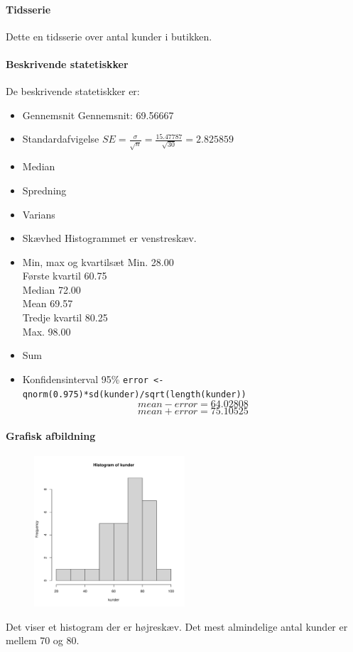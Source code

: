 \documentclass{article}
\begin{document}
\paragraph{Tidsserie} Dette en tidsserie over antal kunder i butikken.


\paragraph{Beskrivende statetiskker}
De beskrivende statetiskker er:
\begin{itemize}
  \item Gennemsnit
    \subitem Gennemsnit: 69.56667
  \item Standardafvigelse
    \subitem $SE = \frac{\sigma}{\sqrt{n}}= \frac{15.47787}{\sqrt{30}}  = 2.825859$
  \item Median
  \item Spredning
  \item Varians
  \item Skævhed
    \subitem Histogrammet er venstreskæv.
  \item Min, max og kvartilsæt
    \subitem Min. 28.00 \\
    Første kvartil 60.75 \\
    Median  72.00 \\
    Mean 69.57 \\  
    Tredje kvartil 80.25 \\ 
    Max.  98.00                                                 
  \item Sum
  \item Konfidensinterval 95\% 
    \subitem
 \lstinline|error <- qnorm(0.975)*sd(kunder)/sqrt(length(kunder))|
 $$mean-error =  64.02808$$
 $$mean+error = 75.10525$$
\end{itemize}

\paragraph{Grafisk afbildning}
\begin{figure}[H] 
  \centering
  \includegraphics[width=0.5\textwidth]{../velser/uge37/R/opg2plot.pdf}
\end{figure}
Det viser et histogram der er højreskæv. Det mest almindelige antal kunder er
mellem 70 og 80.
\end{document}
